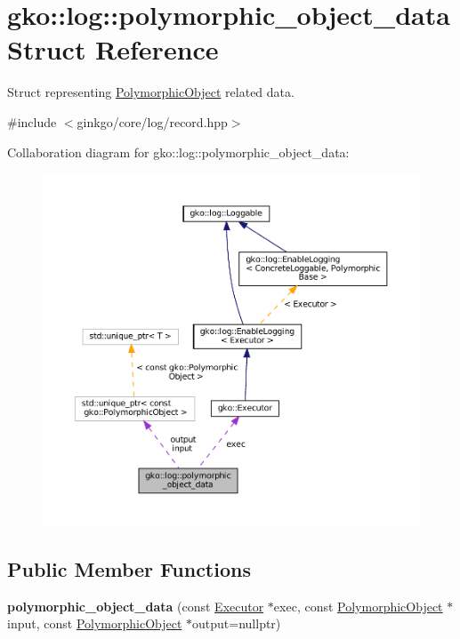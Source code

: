 \hypertarget{structgko_1_1log_1_1polymorphic__object__data}{}\section{gko\+:\+:log\+:\+:polymorphic\+\_\+object\+\_\+data Struct Reference}
\label{structgko_1_1log_1_1polymorphic__object__data}


Struct representing \hyperlink{classgko_1_1PolymorphicObject}{Polymorphic\+Object} related data.  




{\ttfamily \#include $<$ginkgo/core/log/record.\+hpp$>$}



Collaboration diagram for gko\+:\+:log\+:\+:polymorphic\+\_\+object\+\_\+data\+:
\nopagebreak
\begin{figure}[H]
\begin{center}
\leavevmode
\includegraphics[width=350pt]{structgko_1_1log_1_1polymorphic__object__data__coll__graph}
\end{center}
\end{figure}
\subsection*{Public Member Functions}
\begin{DoxyCompactItemize}
\item 
\mbox{\label{structgko_1_1log_1_1polymorphic__object__data_afe3742f5580ce8805b6a33dfa9d79abd}} 
{\bfseries polymorphic\+\_\+object\+\_\+data} (const \hyperlink{classgko_1_1Executor}{Executor} $\ast$exec, const \hyperlink{classgko_1_1PolymorphicObject}{Polymorphic\+Object} $\ast$input, const \hyperlink{classgko_1_1PolymorphicObject}{Polymorphic\+Object} $\ast$output=nullptr)
\end{DoxyCompactItemize}
